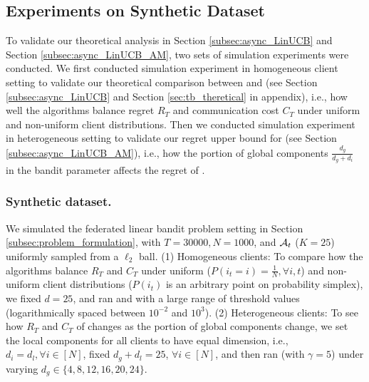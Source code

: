 \subsection{Experiments on Synthetic Dataset}
To validate our theoretical analysis in Section \ref{subsec:async_LinUCB} and Section \ref{subsec:async_LinUCB_AM}, two sets of simulation experiments were conducted.
We first conducted simulation experiment in homogeneous client setting to
validate our theoretical comparison between \modelone{} and \modelbaseline{} (see Section \ref{subsec:async_LinUCB} and Section \ref{sec:tb_theretical} in appendix), i.e., how well the algorithms balance regret $R_{T}$ and communication cost $C_{T}$ under uniform and non-uniform client distributions. Then we conducted simulation experiment in heterogeneous setting to validate our regret upper bound for \modeltwo{} (see Section \ref{subsec:async_LinUCB_AM}), i.e., how the portion of global components $\frac{d_{g}}{d_{g}+d_{i}}$ in the bandit parameter affects the regret of \modeltwo{}.
\subsubsection{Synthetic dataset.} We simulated the federated linear bandit problem setting in Section \ref{subsec:problem_formulation}, with $T=30000, N=1000$, and $\mathcal{A}_{t}$ ($K=25$) uniformly sampled from a $\ell_2$ ball.
(1) Homogeneous clients: 
To compare how the algorithms balance $R_{T}$ and $C_{T}$ under uniform ($P(i_{t}=i)=\frac{1}{N},\forall i,t$) and non-uniform client distributions ($P(i_{t})$ is an arbitrary point on probability simplex), we fixed $d=25$, and ran \modelone{} and \modelbaseline{} with a large range of threshold values (logarithmically spaced between $10^{-2}$ and $10^{3}$).
(2) Heterogeneous clients: To see how $R_{T}$ and $C_{T}$ of \modeltwo{} changes as the portion of global components change, we set the local components for all clients to have equal dimension, i.e., $d_{i}=d_{l},\forall i \in [N]$, fixed $d_{g}+d_{l}=25$, $\forall i\in [N]$, and then ran \modeltwo{} (with $\gamma=5$) under varying $d_{g} \in \{4,8,12,16,20,24\}$.


